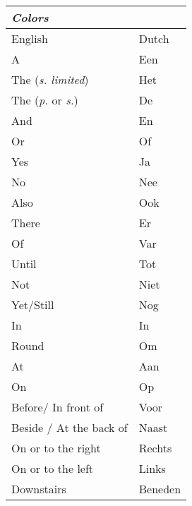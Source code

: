 \documentclass[letterpaper,11pt]{article}
\begin{document}
\begin{tabular}[t]{|l | l|}
    \hline
    \textit{Colors}                  &         \\
    \hline
    English                          & Dutch   \\
    \hline
    A                                & Een     \\
    The (\textit{s. limited})        & Het     \\
    The (\textit{p.} or \textit{s.}) & De      \\
    And                              & En      \\
    Or                               & Of      \\
    Yes                              & Ja      \\
    No                               & Nee     \\
    Also                             & Ook     \\
    There                            & Er      \\
    Of                               & Var     \\
    Until                            & Tot     \\
    Not                              & Niet    \\
    Yet/Still                        & Nog     \\
    In                               & In      \\
    Round                            & Om      \\
    At                               & Aan     \\
    On                               & Op      \\
    Before/ In front of              & Voor    \\
    Beside / At the back of          & Naast   \\
    On or to the right               & Rechts  \\
    On or to the left                & Links   \\
    Downstairs                       & Beneden \\
    \hline
\end{tabular}    
\end{document}
